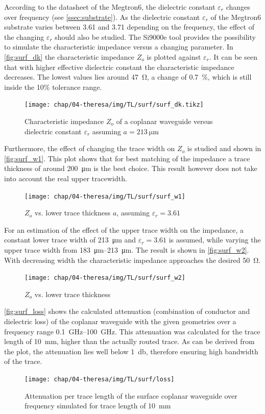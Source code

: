 According to the datasheet of the Megtron6, the dielectric constant $\varepsilon_r$ changes over frequency (see \autoref{ssec:substrate}).
As the dielectric constant $\varepsilon_r$ of the Megtron6 substrate varies between 3.61 and 3.71 depending on the frequency, the effect of the changing $\varepsilon_r$ should also be studied. 
The Si9000e tool provides the possibility to simulate the characteristic impedance versus a changing parameter.
In \autoref{fig:surf_dk} the characteristic impedance $Z_o$ is plotted against $\varepsilon_r$.
It can be seen that with higher effective dielectric constant the characteristic impedance decreases.
The lowest values lies around \SI{47}{\ohm}, a change of \SI{0.7}{\percent}, which is still inside the 10\% tolerance range.
\begin{figure}[tb]
	\centering
	\texttt{[image: chap/04-theresa/img/TL/surf/surf\_dk.tikz]}
	\caption[CWG, $Z_o$ vs $\varepsilon_r$]{Characteristic impedance $Z_o$ of a coplanar waveguide versus dielectric constant $\varepsilon_r$ assuming $a = \SI{213}{\micro \meter}$}
	\label{fig:surf_dk}
\end{figure}

Furthermore, the effect of changing the trace width on $Z_o$ is studied and shown in \autoref{fig:surf_w1}.
This plot shows that for best matching of the impedance a trace thickness of around \SI{200}{\micro \meter} is the best choice.
This result however does not take into account the real upper tracewidth.
\begin{figure}[tb]
	\centering
	\texttt{[image: chap/04-theresa/img/TL/surf/surf\_w1]}
	\caption[CWG, $Z_o$ vs. $a$]{$Z_o$ vs. lower trace thickness $a$, assuming $\varepsilon_r = 3.61$}
	\label{fig:surf_w1}
\end{figure}

For an estimation of the effect of the upper trace width on the impedance, a constant lower trace width of \SI{213}{\micro \meter} and $\varepsilon_r = 3.61$ is assumed, while varying the upper trace width from \SIrange{183}{213}{\micro \meter}.
The result is shown in \autoref{fig:surf_w2}.
With decreasing width the characteristic impedance approaches the desired \SI{50}{\ohm}.
\begin{figure}[tb]
	\centering
	\texttt{[image: chap/04-theresa/img/TL/surf/surf\_w2]}
	\caption{$Z_o$ vs. lower trace thickness}
	\label{fig:surf_w2}
\end{figure}

\autoref{fig:surf_loss} shows the calculated attenuation (combination of conductor and dielectric loss) of the coplanar waveguide with the given geometries over a frequency range \SIrange{0.1}{100}{\GHz}. 
This attenuation was calculated for the trace length of \SI{10}{\mm}, higher than the actually routed trace.
As can be derived from the plot, the attenuation lies well below \SI{1}{\decibel}, therefore ensuring high bandwidth of the trace.
\begin{figure}[tb]
	\centering
	\texttt{[image: chap/04-theresa/img/TL/surf/loss]}
	\caption[Attenuation CPWG for \SI{10}{\mm}]{Attenuation per trace length of the surface coplanar waveguide over frequency simulated for trace length of \SI{10}{\mm}}
	\label{fig:surf_loss}
\end{figure}


